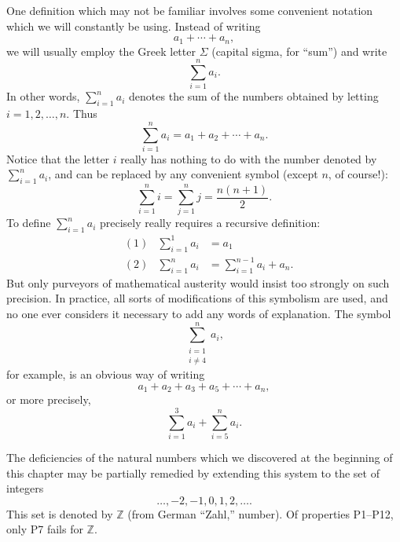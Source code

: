 One definition which may not be familiar involves some convenient notation
which we will constantly be using. Instead of writing
\[ a_1 + \cdots + a_n, \]
we will usually employ the Greek letter $\Sigma$ (capital sigma, for ``sum'')
and write
\[ \sum_{i=1}^{n} a_i. \]
In other words, $\sum_{i=1}^{n} a_i$ denotes the sum of the numbers obtained
by letting $i = 1, 2, \dots, n$. Thus
\[
\sum_{i=1}^{n} a_i
= a_1 + a_2 + \cdots + a_n.
\]
Notice that the letter $i$ really has nothing to do with the number denoted by
$\sum_{i=1}^{n} a_i$, and can be replaced by any convenient symbol (except $n$,
of course!):
\[
\sum_{i=1}^{n} i = \sum_{j=1}^{n} j = \frac{n(n+1)}{2}.
\]
To define $\sum_{i=1}^{n} a_i$ precisely really requires a recursive
definition:
\begin{align*}
&(1) & \sum_{i=1}^{1} a_i &= a_1\\
&(2) & \sum_{i=1}^{n} a_i &= \sum_{i=1}^{n-1} a_i + a_n.
\end{align*}
But only purveyors of mathematical austerity would insist too strongly on
such precision. In practice, all sorts of modifications of this symbolism are
used, and no one ever considers it necessary to add any words of explanation.
The symbol
\[ \sum_{\substack{i=1\\ i \neq 4}}^{n} a_i, \]
for example, is an obvious way of writing
\[ a_1 + a_2 + a_3 + a_5 + \cdots + a_n, \]
or more precisely,
\[ \sum_{i=1}^{3} a_i + \sum_{i=5}^{n} a_i. \]

The deficiencies of the natural numbers which we discovered at the beginning
of this chapter may be partially remedied by extending this system to the set
of integers
\[ \dots, -2, -1, 0, 1, 2, \dots . \]
This set is denoted by $\mathbb{Z}$ (from German ``Zahl,'' number). Of
properties P1--P12, only P7 fails for $\mathbb{Z}$.


